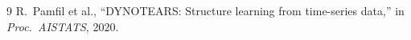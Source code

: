 
\begin{thebibliography}{9}
   
   
   R.~Pamfil et al., ``DYNOTEARS: Structure learning from time-series data,'' in \emph{Proc.\ AISTATS}, 2020.
\end{thebibliography}


